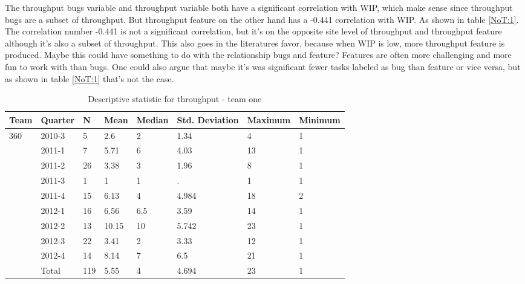 \documentclass[UKenglish]{ifimaster}  %
\begin{document}
The throughput bugs variable and throughput variable both have a significant correlation with WIP, which make sense since throughput bugs are a subset of throughput. But throughput feature on the other hand has a -0.441 correlation with WIP. %
As shown in table \ref{NoT:1}. The correlation number -0.441 is not a significant correlation, but it's on the opposite site level of throughput and throughput feature although it's also a subset of throughput.  This also goes in the literatures favor, because when WIP is low, more throughput feature is produced. Maybe this could have something to do with the relationship bugs and feature? Features are often more challenging and more fun to work with than bugs.
One could also argue that maybe it's was significant fewer tasks labeled as bug than feature or vice versa, but as shown in table \ref{NoT:1} that's not the case. 

   \begin{table}[!htbp]
 \begin{tabular}{ | l | l | l | l | l | l | l | l | }
\hline
	Team & Quarter & N & Mean & Median & Std. Deviation & Maximum & Minimum \\ \hline
	360 & 2010-3 & 5 & 2.6 & 2 & 1.34 & 4 & 1 \\ \hline
	 & 2011-1 & 7 & 5.71 & 6 & 4.03 & 13 & 1 \\ \hline
	 & 2011-2 & 26 & 3.38 & 3 & 1.96 & 8 & 1 \\ \hline
	 & 2011-3 & 1 & 1 & 1 & . & 1 & 1 \\ \hline
	 & 2011-4 & 15 & 6.13 & 4 & 4.984 & 18 & 2 \\ \hline
	 & 2012-1 & 16 & 6.56 & 6.5 & 3.59 & 14 & 1 \\ \hline
	 & 2012-2 & 13 & 10.15 & 10 & 5.742 & 23 & 1 \\ \hline
	 & 2012-3 & 22 & 3.41 & 2 & 3.33 & 12 & 1 \\ \hline
	 & 2012-4 & 14 & 8.14 & 7 & 6.5 & 21 & 1 \\ \hline
	 & Total & 119 & 5.55 & 4 & 4.694 & 23 & 1 \\ \hline
	 \end{tabular}
	 \caption{Descriptive statistic for throughput - team one }
	 \label{DS:T:1}
	 \end{table}%
	 
\end{document}
